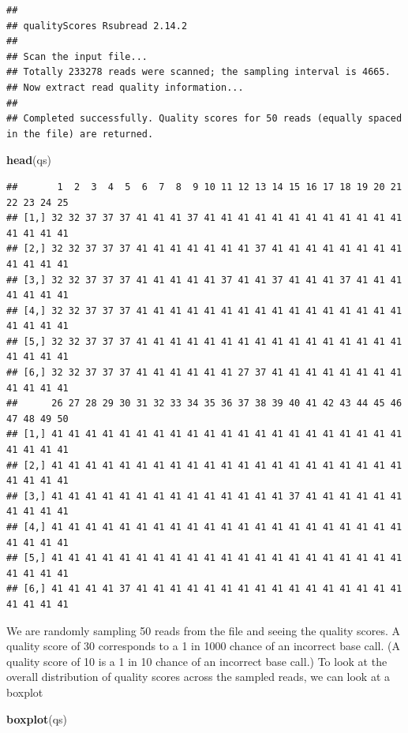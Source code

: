 \documentclass[
]{book}
\newenvironment{Shaded}{\begin{snugshade}}{\end{snugshade}}
\newcommand{\FunctionTok}[1]{\textcolor[rgb]{0.13,0.29,0.53}{\textbf{#1}}}
\newcommand{\NormalTok}[1]{#1}
\begin{document}
\begin{verbatim}
## 
## qualityScores Rsubread 2.14.2
## 
## Scan the input file...
## Totally 233278 reads were scanned; the sampling interval is 4665.
## Now extract read quality information...
## 
## Completed successfully. Quality scores for 50 reads (equally spaced in the file) are returned.
\end{verbatim}

\begin{Shaded}
\begin{Highlighting}[]
\FunctionTok{head}\NormalTok{(qs)}
\end{Highlighting}
\end{Shaded}

\begin{verbatim}
##       1  2  3  4  5  6  7  8  9 10 11 12 13 14 15 16 17 18 19 20 21 22 23 24 25
## [1,] 32 32 37 37 37 41 41 41 37 41 41 41 41 41 41 41 41 41 41 41 41 41 41 41 41
## [2,] 32 32 37 37 37 41 41 41 41 41 41 41 37 41 41 41 41 41 41 41 41 41 41 41 41
## [3,] 32 32 37 37 37 41 41 41 41 41 37 41 41 37 41 41 41 37 41 41 41 41 41 41 41
## [4,] 32 32 37 37 37 41 41 41 41 41 41 41 41 41 41 41 41 41 41 41 41 41 41 41 41
## [5,] 32 32 37 37 37 41 41 41 41 41 41 41 41 41 41 41 41 41 41 41 41 41 41 41 41
## [6,] 32 32 37 37 37 41 41 41 41 41 41 27 37 41 41 41 41 41 41 41 41 41 41 41 41
##      26 27 28 29 30 31 32 33 34 35 36 37 38 39 40 41 42 43 44 45 46 47 48 49 50
## [1,] 41 41 41 41 41 41 41 41 41 41 41 41 41 41 41 41 41 41 41 41 41 41 41 41 41
## [2,] 41 41 41 41 41 41 41 41 41 41 41 41 41 41 41 41 41 41 41 41 41 41 41 41 41
## [3,] 41 41 41 41 41 41 41 41 41 41 41 41 41 41 37 41 41 41 41 41 41 41 41 41 41
## [4,] 41 41 41 41 41 41 41 41 41 41 41 41 41 41 41 41 41 41 41 41 41 41 41 41 41
## [5,] 41 41 41 41 41 41 41 41 41 41 41 41 41 41 41 41 41 41 41 41 41 41 41 41 41
## [6,] 41 41 41 41 37 41 41 41 41 41 41 41 41 41 41 41 41 41 41 41 41 41 41 41 41
\end{verbatim}

We are randomly sampling 50 reads from the file and seeing the quality scores. A quality score of 30 corresponds to a 1 in 1000 chance of an incorrect base call. (A quality score of 10 is a 1 in 10 chance of an incorrect base call.) To look at the overall distribution of quality scores across the sampled reads, we can look at a boxplot

\begin{Shaded}
\begin{Highlighting}[]
\FunctionTok{boxplot}\NormalTok{(qs)}
\end{Highlighting}
\end{Shaded}
\end{document}
